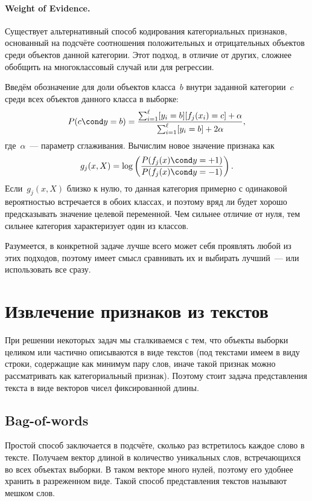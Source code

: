 \documentclass[12pt,fleqn]{article}
\begin{document}
\paragraph{Weight of Evidence.}
Существует альтернативный способ кодирования категориальных признаков, основанный на подсчёте соотношения
положительных и отрицательных объектов среди объектов данной категории.
Этот подход, в отличие от других, сложнее обобщить на многоклассовый случай или для регрессии.

Введём обозначение для доли объектов класса~$b$ внутри заданной категории~$c$ среди всех объектов данного класса в выборке:
\[
    P(c \cond y = b)
    =
    \frac{
        \sum_{i = 1}^{\ell}
            [y_i = b] [f_j(x_i) = c]
        +
        \alpha
    }{
        \sum_{i = 1}^{\ell}
            [y_i = b]
        +
        2 \alpha
    },
\]
где~$\alpha$~--- параметр сглаживания.
Вычислим новое значение признака как
\[
    g_j(x, X)
    =
    \log\left(
        \frac{
            P(f_j(x) \cond y = +1)
        }{
            P(f_j(x) \cond y = -1)
        }
    \right).
\]
Если~$g_j(x, X)$ близко к нулю, то данная категория примерно с одинаковой вероятностью
встречается в обоих классах, и поэтому вряд ли будет хорошо предсказывать значение целевой переменной.
Чем сильнее отличие от нуля, тем сильнее категория характеризует один из классов.

Разумеется, в конкретной задаче лучше всего может себя проявлять любой из этих подходов,
поэтому имеет смысл сравнивать их и выбирать лучший~--- или использовать все сразу.

\section{Извлечение признаков из текстов}

При решении некоторых задач мы сталкиваемся с тем, что объекты выборки целиком или частично описываются в виде текстов (под текстами имеем в виду строки, содержащие как минимум пару слов, иначе такой признак можно рассматривать как категориальный признак). Поэтому стоит задача представления текста в виде векторов чисел фиксированной длины.

\subsection{Bag-of-words}

Простой способ заключается в подсчёте, сколько раз встретилось каждое слово в тексте. Получаем вектор длиной в количество уникальных слов, встречающихся во всех объектах выборки. В таком векторе много нулей, поэтому его удобнее хранить в разреженном виде. Такой способ представления текстов называют мешком слов.
\end{document}

